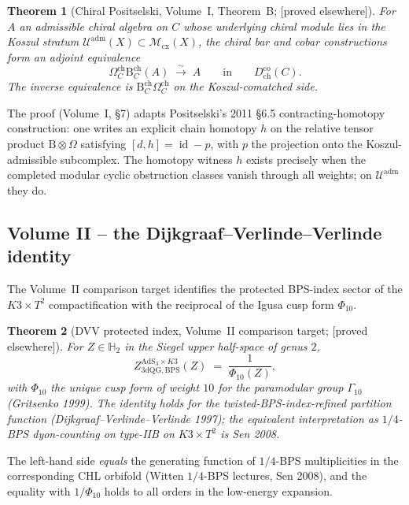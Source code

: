 \documentclass[11pt,reqno]{amsart}
\theoremstyle{plain}
\newtheorem{theorem}{Theorem}[section]
\theoremstyle{definition}
\theoremstyle{remark}
\providecommand{\ClaimStatusProvedElsewhere}{\textnormal{[proved elsewhere]}}
\DeclareMathOperator{\id}{id}
\newcommand{\AdS}{\mathrm{AdS}}
\newcommand{\Hbb}{\mathbb{H}}
\newcommand{\cM}{\mathcal{M}}
\newcommand{\cU}{\mathcal{U}}
\newcommand{\Bar}{\mathrm{B}}
\newcommand{\Cobar}{\Omega}
\begin{document}
\begin{theorem}[Chiral Positselski, Volume~I, Theorem~B; \ClaimStatusProvedElsewhere]
\label{thm:climax-I}
For $A$ an admissible chiral algebra on $C$ whose underlying chiral module lies in the Koszul stratum $\cU^{\mathrm{adm}}(X) \subset \cM_{\mathrm{cx}}(X)$, the chiral bar and cobar constructions form an adjoint equivalence
\[
  \Cobar^{\mathrm{ch}}_C \Bar^{\mathrm{ch}}_C(A) \;\xrightarrow{\sim}\; A \qquad\text{in}\qquad D^{\mathrm{co}}_{\mathrm{ch}}(C).
\]
The inverse equivalence is $\Bar^{\mathrm{ch}}_C \Cobar^{\mathrm{ch}}_C$ on the Koszul-comatched side.
\end{theorem}

The proof (Volume~I, §7) adapts Positselski's 2011 §6.5 contracting-homotopy construction: one writes an explicit chain homotopy $h$ on the relative tensor product $\Bar \otimes \Cobar$ satisfying $[d, h] = \id - p$, with $p$ the projection onto the Koszul-admissible subcomplex. The homotopy witness $h$ exists precisely when the completed modular cyclic obstruction classes vanish through all weights; on $\cU^{\mathrm{adm}}$ they do.

\subsection{Volume II -- the Dijkgraaf--Verlinde--Verlinde identity}
The Volume~II comparison target identifies the protected BPS-index
sector of the $K3\times T^2$ compactification with the reciprocal of
the Igusa cusp form $\Phi_{10}$.

\begin{theorem}[DVV protected index, Volume~II comparison target; \ClaimStatusProvedElsewhere]
\label{thm:climax-II}
For $Z \in \Hbb_2$ in the Siegel upper half-space of genus $2$,
\[
  Z^{\AdS_3 \times K3}_{\mathrm{3dQG, BPS}}(Z) \;=\; \frac{1}{\Phi_{10}(Z)},
\]
with $\Phi_{10}$ the unique cusp form of weight $10$ for the paramodular group $\Gamma_{10}$ (Gritsenko 1999). The identity holds for the twisted-BPS-index-refined partition function (Dijkgraaf--Verlinde--Verlinde 1997); the equivalent interpretation as $1/4$-BPS dyon-counting on type-IIB on $K3 \times T^2$ is Sen 2008.
\end{theorem}

The left-hand side \emph{equals} the generating function of $1/4$-BPS multiplicities in the corresponding CHL orbifold (Witten $1/4$-BPS lectures, Sen 2008), and the equality with $1/\Phi_{10}$ holds to all orders in the low-energy expansion.
\end{document}
